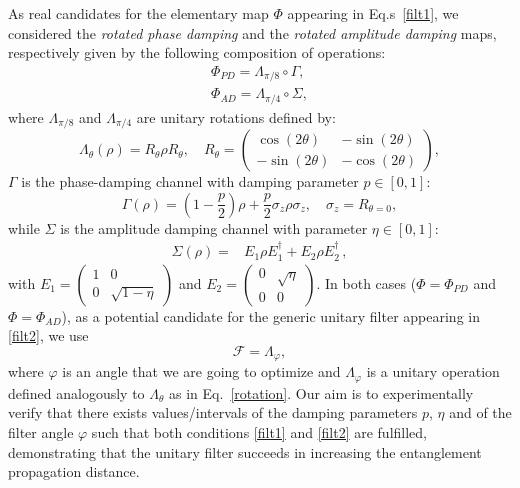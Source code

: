 \documentclass[aps,twocolumn,pra,superscriptaddress,showpacs,showkeys,floatfix]{revtex4-1}
\begin{document}
As real candidates for the elementary map $\Phi$ appearing in Eq.s\ \eqref{filt1}, we considered the {\it rotated phase damping} and the {\it rotated amplitude damping} maps, respectively given by the following composition of operations:
\begin{align}
\Phi_{PD}=\Lambda_{\pi/8}\circ\Gamma, \\
\Phi_{AD}=\Lambda_{\pi/4}\circ\Sigma ,
\end{align}
where $\Lambda_{\pi/8}$ and  $\Lambda_{\pi/4}$ are unitary rotations defined by:
\begin{equation} \label{rotation}
\Lambda_\theta(\rho)= R_\theta \rho R_\theta,   \quad R_\theta=\left(\begin{matrix}
\cos(2\theta) & -\sin(2\theta)\\
-\sin(2\theta) & -\cos(2\theta)\end{matrix} \right),
\end{equation}
$\Gamma$ is the phase-damping channel  \cite{nielsen-chuang,desurvire} with damping parameter $p\in[0,1]$:
\begin{equation} \label{PDmap}
\Gamma(\rho)=\left(1-\frac{p}{2}\right)\rho+\frac{p}{2}\sigma_{z} \rho\sigma_{z}, \quad \sigma_z=R_{\theta=0},
\end{equation}
while $\Sigma$ is the amplitude damping channel  \cite{nielsen-chuang,desurvire} with parameter $\eta\in[0,1]$:
\begin{align}\label{ADmap}
\Sigma(\rho)=&E_1
\rho
E_1^\dagger
+E_2
\rho
E_2^\dagger\,,
\end{align}
with $E_1= \left(\begin{matrix}
1 & 0\\
0 & \sqrt{1-\eta}\end{matrix}\right)$ and $E_2=\left(\begin{matrix}
0 & \sqrt{\eta}\\
0 & 0\end{matrix}\right)$.
In both cases ($\Phi=\Phi_{PD}$ and $\Phi=\Phi_{AD}$), as a potential candidate for the generic unitary filter appearing in \eqref{filt2},  we use 
\begin{equation}
\mathcal F= \Lambda_{\varphi} ,
\end{equation}
where $\varphi$ is an angle that we are going to optimize and $\Lambda_\varphi$ is a unitary operation defined analogously to $\Lambda_\theta$ as in Eq.\ \eqref{rotation}.
Our aim is to experimentally verify that there exists values/intervals of the damping parameters $p$, $\eta$ and of the filter angle $\varphi$ such that both
conditions \eqref{filt1} and \eqref{filt2} are fulfilled, demonstrating that the unitary filter succeeds in increasing the entanglement propagation distance.
\end{document}
